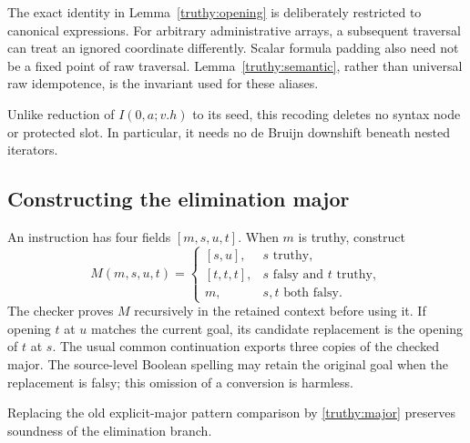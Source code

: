 The exact identity in Lemma~\ref{truthy:opening} is deliberately
restricted to canonical expressions.  For arbitrary administrative
arrays, a subsequent traversal can treat an ignored coordinate
differently.  Scalar formula padding also need not be a fixed point
of raw traversal.  Lemma~\ref{truthy:semantic}, rather than universal
raw idempotence, is the invariant used for these aliases.

Unlike reduction of \(I(0,a;v.h)\) to its seed, this recoding deletes
no syntax node or protected slot.  In particular, it needs no
de Bruijn downshift beneath nested iterators.

\subsection{Constructing the elimination major}

An instruction has four fields \([m,s,u,t]\).  When \(m\) is truthy,
construct
\[
 M(m,s,u,t)=
 \begin{cases}
 [s,u],&s\text{ truthy},\\
 [t,t,t],&s\text{ falsy and }t\text{ truthy},\\
 m,&s,t\text{ both falsy}.
 \end{cases}
 \tag{Constructed major}\label{truthy:major}
\]
The checker proves \(M\) recursively in the retained context before
using it.  If opening \(t\) at \(u\) matches the current goal, its
candidate replacement is the opening of \(t\) at \(s\).  The usual
common continuation exports three copies of the checked major.
The source-level Boolean spelling may retain the original goal when
the replacement is falsy; this omission of a conversion is harmless.

\begin{proposition}
\label{truthy:major-sound}
Replacing the old explicit-major pattern comparison by
\eqref{truthy:major} preserves soundness of the elimination branch.
\end{proposition}

